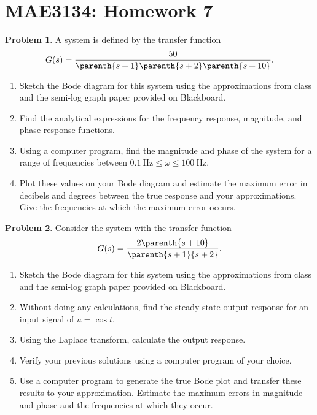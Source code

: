 \documentclass[10pt]{article}
\date{}
\theoremstyle{definition}
\newtheorem{prob}{Problem}[section]
\newenvironment{subprob}%
{\renewcommand{\theenumi}{\alph{enumi}}\renewcommand{\labelenumi}{(\theenumi)}\begin{enumerate}}%
{\end{enumerate}}%
\begin{document}
\pagestyle{empty}
\section*{MAE3134: Homework 7}
\vspace*{-0.4cm}

\begin{prob}
    A system is defined by the transfer function
    \begin{align*}
        G(s) = \frac{50}{\parenth{s+1}\parenth{s+2}\parenth{s+10}} .
    \end{align*}

    \begin{subprob}
        \item Sketch the Bode diagram for this system using the approximations from class and the semi-log graph paper provided on Blackboard.
        \item Find the analytical expressions for the frequency response, magnitude, and phase response functions.
        \item Using a computer program, find the magnitude and phase of the system for a range of frequencies between \( \SI{0.1}{\hertz} \leq \omega \leq \SI{100}{\hertz}\).
        \item Plot these values on your Bode diagram and  estimate the maximum error in decibels and degrees between the true response and your approximations.
            Give the frequencies at which the maximum error occurs.
    \end{subprob}
\end{prob}

\begin{prob}
   Consider the system with the transfer function
   \begin{align*}
        G(s) = \frac{2 \parenth{s + 10}}{\parenth{s+1}{s+2}}.
   \end{align*}
   \begin{subprob}
        \item Sketch the Bode diagram for this system using the approximations from class and the semi-log graph paper provided on Blackboard.
        \item Without doing any calculations, find the steady-state output response for an input signal of \( u = \cos t \).
        \item Using the Laplace transform, calculate the output response.
        \item Verify your previous solutions using a computer program of your choice.
        \item Use a computer program to generate the true Bode plot and transfer these results to your approximation.
            Estimate the maximum errors in magnitude and phase and the frequencies at which they occur.
   \end{subprob}
\end{prob}
\end{document}
